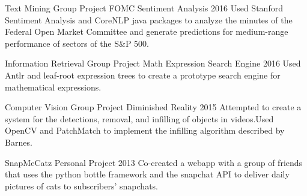 

\begin{cventries}

\cventry
{Text Mining Group Project}
{FOMC Sentiment Analysis}
{}
{2016}
{Used Stanford Sentiment Analysis and CoreNLP java packages to analyze the minutes of the Federal Open Market Committee and generate predictions for medium-range performance of sectors of the S\&P 500.}

\cventry
{Information Retrieval Group Project}
{Math Expression Search Engine}
{}
{2016}
{Used Antlr and leaf-root expression trees to create a prototype search engine for mathematical expressions.}

\cventry
{Computer Vision Group Project}
{Diminished Reality}
{}
{2015}
{Attempted to create a system for the detections, removal, and infilling of objects in videos.Used OpenCV and PatchMatch to implement the infilling algorithm described by Barnes.}

\cventry
{SnapMeCatz}
{Personal Project}
{}
{2013}
{Co-created a webapp with a group of friends that uses the python bottle framework and the snapchat API to deliver daily pictures of cats to subscribers' snapchats.}


\end{cventries}
